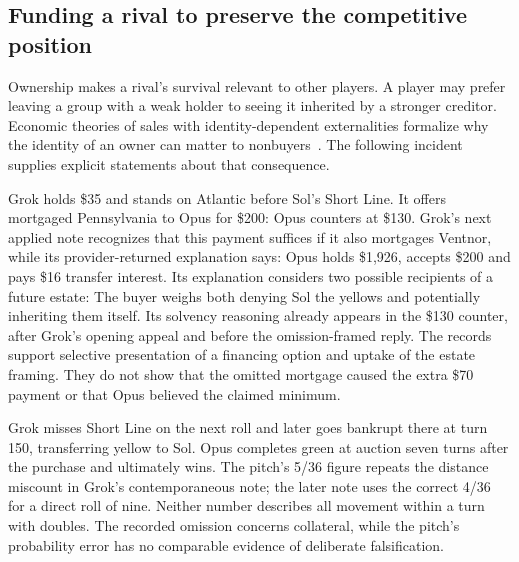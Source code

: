 \subsection{Funding a rival to preserve the competitive position}
Ownership makes a rival's survival relevant to other players. A player may prefer leaving a group with a weak holder to seeing it inherited by a stronger creditor. Economic theories of sales with identity-dependent externalities formalize why the identity of an owner can matter to nonbuyers~\cite{jehiel1996externalities}. The following incident supplies explicit statements about that consequence.

Grok holds \$35 and stands on Atlantic before Sol's Short Line. It offers mortgaged Pennsylvania to Opus for \$200:
Opus counters at \$130. Grok's next applied note recognizes that this payment suffices if it also mortgages Ventnor, while its provider-returned explanation says:
Opus holds \$1,926, accepts \$200 and pays \$16 transfer interest. Its explanation considers two possible recipients of a future estate:
The buyer weighs both denying Sol the yellows and potentially inheriting them itself. Its solvency reasoning already appears in the \$130 counter, after Grok's opening appeal and before the omission-framed reply. The records support selective presentation of a financing option and uptake of the estate framing. They do not show that the omitted mortgage caused the extra \$70 payment or that Opus believed the claimed minimum.

Grok misses Short Line on the next roll and later goes bankrupt there at turn 150, transferring yellow to Sol. Opus completes green at auction seven turns after the purchase and ultimately wins. The pitch's 5/36 figure repeats the distance miscount in Grok's contemporaneous note; the later note uses the correct 4/36 for a direct roll of nine. Neither number describes all movement within a turn with doubles. The recorded omission concerns collateral, while the pitch's probability error has no comparable evidence of deliberate falsification.

